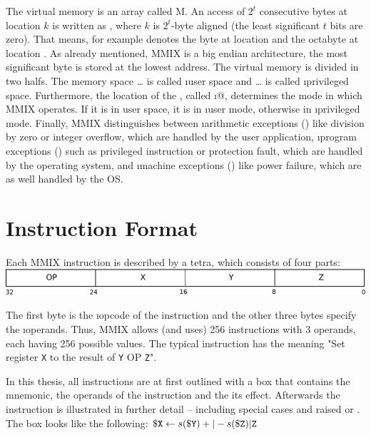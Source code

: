 The virtual memory is an array called M. An access of $2^t$ consecutive bytes at location $k$ is written as , where $k$ is $2^t$-byte aligned (the least significant $t$ bits are zero). That means, for example  denotes the byte at location  and  the octabyte at location . As already mentioned, MMIX is a big endian architecture, \ie the most significant byte is stored at the lowest address. The virtual memory is divided in two halfs. The memory space  \dots {} is called \i{user space} and  \dots {} is called \i{privileged space}. Furthermore, the location of the , called \i{@}, determines the mode in which MMIX operates. If it is in user space, it is in \i{user mode}, otherwise in \i{privileged mode}. Finally, MMIX distinguishes between \i{arithmetic exceptions} () like division by zero or integer overflow, which are handled by the user application, \i{program exceptions} () such as privileged instruction or protection fault, which are handled by the operating system, and \i{machine exceptions} () like power failure, which are as well handled by the OS.

\section{Instruction Format}

Each MMIX instruction is described by a tetra, which consists of four parts:\\
\includegraphics[width=\linewidth]{img/instruction-crop.pdf}

The first byte is the \i{opcode} of the instruction and the other three bytes specify the \i{operands}. Thus, MMIX allows (and uses) 256 instructions with 3 operands, each having 256 possible values. The typical instruction has the meaning "Set register {\tt X} to the result of {\tt Y} OP {\tt Z}". \citep[pg. 2]{mmix-doc}

In this thesis, all instructions are at first outlined with a box that contains the mnemonic, the operands of the instruction and the its effect. Afterwards the instruction is illustrated in further detail -- including special cases and raised  or . The box looks like the following:
\instrtbl
	{}
	{${\tt \$X} \leftarrow s({\tt \$Y}) +|- s({\tt \$Z}){\tt|Z}$}

